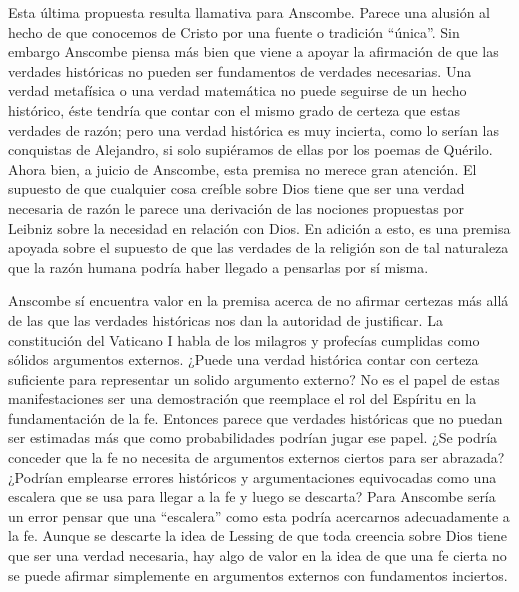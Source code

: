 Esta última propuesta resulta llamativa para Anscombe. Parece una alusión al
hecho de que conocemos de Cristo por una fuente o tradición \enquote{única}. Sin
embargo Anscombe piensa más bien que viene a apoyar la afirmación de que las
verdades históricas no pueden ser fundamentos de verdades necesarias. Una verdad
metafísica o una verdad matemática no puede seguirse de un hecho histórico, éste
tendría que contar con el mismo grado de certeza que estas verdades de razón;
pero una verdad histórica es muy incierta, como lo serían las conquistas de
Alejandro, si solo supiéramos de ellas por los poemas de Quérilo. Ahora bien, a
juicio de Anscombe, esta premisa no merece gran atención. El supuesto de que
cualquier cosa creíble sobre Dios tiene que ser una verdad necesaria de razón le
parece una derivación de las nociones propuestas por Leibniz sobre la necesidad
en relación con Dios. En adición a esto, es una premisa apoyada sobre el
supuesto de que las verdades de la religión son de tal naturaleza que la razón
humana podría haber llegado a pensarlas por sí misma.

Anscombe sí encuentra valor en la premisa acerca de no afirmar certezas más allá
de las que las verdades históricas nos dan la autoridad de justificar. La
constitución del Vaticano I habla de los milagros y profecías cumplidas como
sólidos argumentos externos. ¿Puede una verdad histórica contar con certeza
suficiente para representar un solido argumento externo? No es el papel de estas
manifestaciones ser una demostración que reemplace el rol del Espíritu en la
fundamentación de la fe. Entonces parece que verdades históricas que no puedan
ser estimadas más que como probabilidades podrían jugar ese papel. ¿Se podría
conceder que la fe no necesita de argumentos externos ciertos para ser abrazada?
¿Podrían emplearse errores históricos y argumentaciones equivocadas como una
escalera que se usa para llegar a la fe y luego se descarta? Para Anscombe sería
un error pensar que una \enquote{escalera} como esta podría acercarnos
adecuadamente a la fe. Aunque se descarte la idea de Lessing de que toda
creencia sobre Dios tiene que ser una verdad necesaria, hay algo de valor en la
idea de que una fe cierta no se puede afirmar simplemente en argumentos externos
con fundamentos inciertos.

